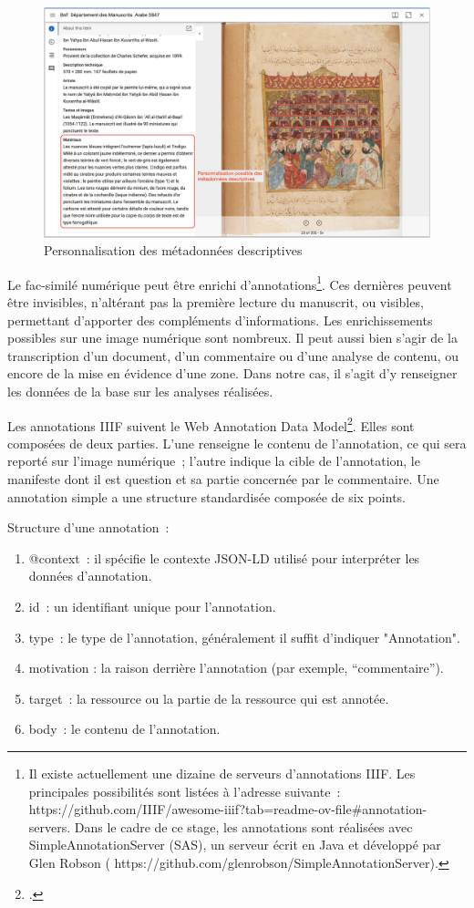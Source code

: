\begin{figure}[H]
	\centering
	\includegraphics[width=\textwidth]{./textes/chap4/mirador-materiau.jpg}
	\caption{Personnalisation des métadonnées descriptives}
	\label{fig:info}
\end{figure}
Le fac-similé numérique peut être enrichi d’annotations\footnote{Il existe actuellement une dizaine de serveurs d’annotations IIIF. Les principales possibilités sont listées à l’adresse suivante~: https://github.com/IIIF/awesome-iiif?tab=readme-ov-file\#annotation-servers. Dans le cadre de ce stage, les annotations sont réalisées avec SimpleAnnotationServer (SAS), un serveur écrit en Java et développé par Glen Robson ( https://github.com/glenrobson/SimpleAnnotationServer).}. Ces dernières peuvent être invisibles, n’altérant pas la première lecture du manuscrit, ou visibles, permettant d’apporter des compléments d’informations. Les enrichissements possibles sur une image numérique sont nombreux. Il peut aussi bien s’agir de la transcription d’un document, d’un commentaire ou d’une analyse de contenu, ou encore de la mise en évidence d’une zone. Dans notre cas, il s’agit d’y renseigner les données de la base sur les analyses réalisées.\par
Les annotations IIIF suivent le Web Annotation Data Model\footcite{noauthor_web_2017}. Elles sont composées de deux parties. L’une renseigne le contenu de l’annotation, ce qui sera reporté sur l’image numérique~; l’autre indique la cible de l’annotation, le manifeste dont il est question et sa partie concernée par le commentaire. Une annotation simple a une structure standardisée composée de six points.\par
Structure d'une annotation~:
\begin{enumerate}
	\item @context~: il spécifie le contexte JSON-LD utilisé pour interpréter les données d'annotation.
	\item id~: un identifiant unique pour l'annotation.
	\item type~: le type de l'annotation, généralement il suffit d’indiquer "Annotation".
	\item motivation : la raison derrière l'annotation (par exemple, \enquote{commentaire}).
	\item target~: la ressource ou la partie de la ressource qui est annotée.
	\item body~: le contenu de l'annotation.
\end{enumerate}\par
